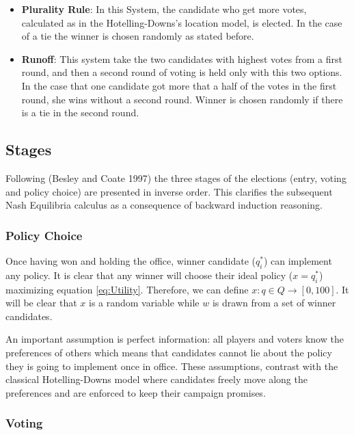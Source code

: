\begin{itemize}
	\item \textbf{Plurality Rule}:
	In this System, the candidate who get more votes, calculated as in the Hotelling-Downs's location model, is elected. 
	In the case of a tie the winner is chosen randomly as stated before.
	\item \textbf{Runoff}:
	This system take the two candidates with highest votes from a first round, and then a second round of voting is held only with this two options. In the case that one candidate got more that a half of the votes in the first round, she wins without a second round. Winner is chosen randomly if there is a tie in the second round.
\end{itemize}

\subsection{Stages}\label{stages}

Following (Besley and Coate 1997) the three stages of the elections (entry, voting and policy choice) are
presented in inverse order. This clarifies the subsequent Nash Equilibria
calculus as a consequence of backward induction reasoning.

\subsubsection{Policy Choice}\label{policy-choice}

Once having won and holding the office, winner candidate (\(q_i^*\)) can
implement any policy. It is clear that any
winner will choose their ideal policy (\(x=q_i^*\)) maximizing equation
\ref{eq:Utility}. Therefore, we can define
\(x: q \in Q \rightarrow [0,100]\).
It will be clear that \(x\) is a random variable while \(w\) is drawn
from a set of winner candidates.

An important assumption is perfect information: all players and voters know the
preferences of others which means that candidates cannot lie about
the policy they is going to implement once in office. 
These assumptions, contrast with the classical
Hotelling-Downs model where candidates freely move along the preferences and are enforced to keep their campaign promises.

\subsubsection{Voting}\label{voting}


